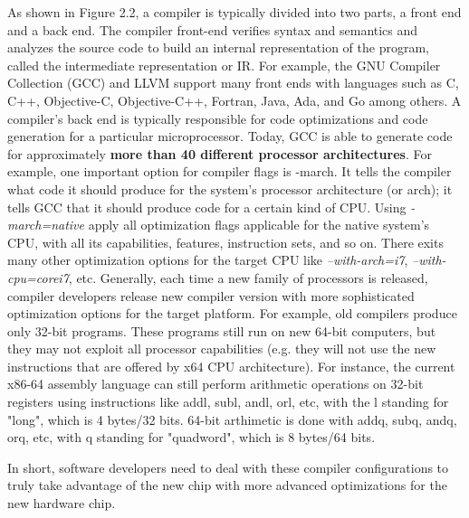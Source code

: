 As shown in Figure 2.2, a compiler is typically divided into two parts, a front end and a back end. The compiler front-end verifies syntax and semantics and analyzes the source code to build an internal representation of the program, called the intermediate representation or IR. For example, the GNU Compiler Collection (GCC) and LLVM support many front ends with languages such as C, C++, Objective-C, Objective-C++, Fortran, Java, Ada, and Go among others. 
A compiler’s back end is typically responsible for code optimizations and code generation for a particular microprocessor. Today, GCC is able to generate code for approximately \textbf{more than 40 different processor architectures}.
For example, one important option for compiler flags is -march. It tells the compiler what code it should produce for the system's processor architecture (or arch); it tells GCC that it should produce code for a certain kind of CPU. Using \textit{-march=native} apply all optimization flags applicable for the native system's CPU, with all its capabilities, features, instruction sets, and so on. There exits many other optimization options for the target CPU like \textit{--with-arch=i7}, \textit{--with-cpu=corei7}, etc.
Generally, each time a new family of processors is released, compiler developers release new compiler version with more sophisticated optimization options for the target platform. For example, old compilers produce only 32-bit programs. These programs still run on new 64-bit computers, but they may not exploit all processor capabilities (e.g. they will not use the new instructions that are offered by x64 CPU architecture). For instance, the current x86-64 assembly language can still perform arithmetic operations on 32-bit registers using instructions like addl, subl, andl, orl, etc, with the l standing for "long", which is 4 bytes/32 bits. 64-bit arthimetic is done with addq, subq, andq, orq, etc, with q standing for "quadword", which is 8 bytes/64 bits.

In short, software developers need to deal with these compiler configurations to truly take advantage of the new chip with more advanced optimizations for the new hardware chip.








